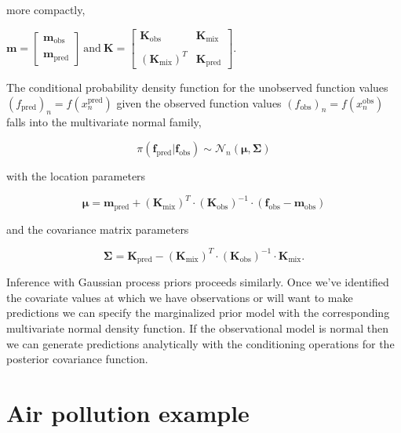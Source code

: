 \documentclass[a4paper, 10pt]{article}
\begin{document}
\begin{flushleft}
   more compactly,

   \vspace{1em}

   $\mathbf{m} = 
   \begin{bmatrix}
      \mathbf{m}_{\text{obs}} \\
      \\
      \mathbf{m}_{\text{pred}}
   \end{bmatrix}  
   \: 
   \text{and}
   \:
   \mathbf{K} = 
   \begin{bmatrix}
      \mathbf{K}_{\text{obs}} & \mathbf{K}_{\text{mix}} \\
      \\
      (\mathbf{K}_{\text{mix}})^{T} & \mathbf{K}_{\text{pred}}
   \end{bmatrix}$.

   \vspace{1em}

   The conditional probability density function for the unobserved function values $(f_{\text{pred}})_{n} = f(x_{n}^{\text{pred}})$ given the observed function values  $(f_{\text{obs}})_{n} = f(x_{n}^{\text{obs}})$ falls into the multivariate normal family,

   $$\pi(\mathbf{f}_{\text{pred}} | \mathbf{f}_{\text{obs}}) \sim \mathcal{N}_{n}(\boldsymbol{\mu}, \boldsymbol{\Sigma})$$

   with the location parameters 

   $$\boldsymbol{\mu} = \mathbf{m}_{\text{pred}} + (\mathbf{K}_{\text{mix}})^{T} \cdot (\mathbf{K}_{\text{obs}})^{-1} \cdot (\mathbf{f}_{\text{obs}} - \mathbf{m}_{\text{obs}}) $$

   and the covariance matrix parameters

   $$\boldsymbol{\Sigma} = \mathbf{K}_{\text{pred}} - (\mathbf{K}_{\text{mix}})^{T} \cdot (\mathbf{K}_{\text{obs}})^{-1} \cdot \mathbf{K}_{\text{mix}}.$$

   Inference with Gaussian process priors proceeds similarly. Once we've identified the covariate values at which we have observations or will want to make predictions we can specify the marginalized prior model with the corresponding multivariate normal density function. If the observational model is normal then we can generate predictions analytically with the conditioning operations for the posterior covariance function.

   \section*{Air pollution example}

\end{flushleft}
\end{document}

